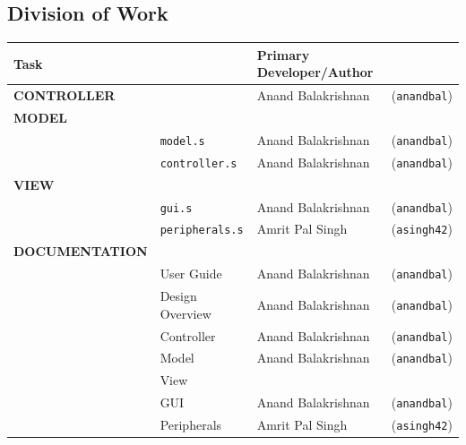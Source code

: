 \subsection{Division of Work}

\begin{table}[H]
\centering
\begin{tabular}{|ll|ll|}
\hline
\textbf{Task}           &                       & \textbf{Primary Developer/Author}                       \\ \hline
\textbf{CONTROLLER}     &                       & Anand Balakrishnan           & (\texttt{anandbal})   \\ \hline
\textbf{MODEL}          &                       &                              &                       \\ \hline
                        & \texttt{model.s}      & Anand Balakrishnan           & (\texttt{anandbal})   \\ 
                        & \texttt{controller.s} & Anand Balakrishnan           & (\texttt{anandbal})   \\ \hline
\textbf{VIEW}           &                       &                              &                       \\ \hline
                        & \texttt{gui.s}        & Anand Balakrishnan           & (\texttt{anandbal})   \\
                        & \texttt{peripherals.s}& Amrit Pal Singh              & (\texttt{asingh42})   \\ \hline
\textbf{DOCUMENTATION}  &                              \\ \hline
                        & User Guide            & Anand Balakrishnan           & (\texttt{anandbal})   \\ \hline
                        & Design Overview       & Anand Balakrishnan           & (\texttt{anandbal})   \\ \hline
                        & Controller            & Anand Balakrishnan           & (\texttt{anandbal})   \\ \hline
                        & Model           & Anand Balakrishnan           & (\texttt{anandbal})   \\ \hline
                        & View            &                               \\ \hline
                        & GUI             & Anand Balakrishnan           & (\texttt{anandbal})   \\ \hline
                        & Peripherals     & Amrit Pal Singh              & (\texttt{asingh42})   \\ \hline
\end{tabular}
\end{table}

\newpagei

\newpage

\newpage



